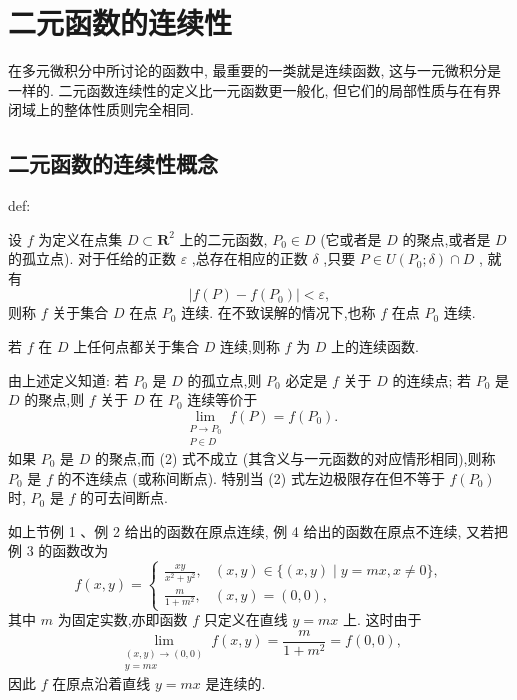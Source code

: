 \section{二元函数的连续性}

在多元微积分中所讨论的函数中, 最重要的一类就是连续函数, 这与一元微积分是一样的. 二元函数连续性的定义比一元函数更一般化, 但它们的局部性质与在有界闭域上的整体性质则完全相同.

\subsection{二元函数的连续性概念}

\begin{definition}{}{def:}

\end{definition}
设 \(f\) 为定义在点集 \(D \subset  {\mathbf{R}}^{2}\) 上的二元函数, \({P}_{0} \in  D\) (它或者是 \(D\) 的聚点,或者是 \(D\) 的孤立点). 对于任给的正数 \(\varepsilon\) ,总存在相应的正数 \(\delta\) ,只要 \(P \in  U\left( {{P}_{0};\delta }\right)  \cap  D\) , 就有
\[
\left| {f\left( P\right)  - f\left( {P}_{0}\right) }\right|  < \varepsilon , \tag{1}
\]
则称 \(f\) 关于集合 \(D\) 在点 \({P}_{0}\) 连续. 在不致误解的情况下,也称 \(f\) 在点 \({P}_{0}\) 连续.

若 \(f\) 在 \(D\) 上任何点都关于集合 \(D\) 连续,则称 \(f\) 为 \(D\) 上的连续函数.

由上述定义知道: 若 \({P}_{0}\) 是 \(D\) 的孤立点,则 \({P}_{0}\) 必定是 \(f\) 关于 \(D\) 的连续点; 若 \({P}_{0}\) 是 \(D\) 的聚点,则 \(f\) 关于 \(D\) 在 \({P}_{0}\) 连续等价于
\[
\mathop{\lim }\limits_{\substack{{P \rightarrow  {P}_{0}} \\  {P \in  D} }}f\left( P\right)  = f\left( {P}_{0}\right) . \tag{2}
\]
如果 \({P}_{0}\) 是 \(D\) 的聚点,而 (2) 式不成立 (其含义与一元函数的对应情形相同),则称 \({P}_{0}\) 是 \(f\) 的不连续点 (或称间断点). 特别当 (2) 式左边极限存在但不等于 \(f\left( {P}_{0}\right)\) 时, \({P}_{0}\) 是 \(f\) 的可去间断点.

如上节例 1 、例 2 给出的函数在原点连续, 例 4 给出的函数在原点不连续, 又若把例 3 的函数改为
\[
f\left( {x,y}\right)  = \left\{  \begin{array}{ll} \frac{xy}{{x}^{2} + {y}^{2}}, & \left( {x,y}\right)  \in  \{ \left( {x,y}\right)  \mid  y = {mx},x \neq  0\} , \\  \frac{m}{1 + {m}^{2}}, & \left( {x,y}\right)  = \left( {0,0}\right) , \end{array}\right.
\]
其中 \(m\) 为固定实数,亦即函数 \(f\) 只定义在直线 \(y = {mx}\) 上. 这时由于
\[
\mathop{\lim }\limits_{\substack{{\left( {x,y}\right)  \rightarrow  \left( {0,0}\right) } \\  {y = {mx}} }}f\left( {x,y}\right)  = \frac{m}{1 + {m}^{2}} = f\left( {0,0}\right) ,
\]
因此 \(f\) 在原点沿着直线 \(y = {mx}\) 是连续的.

